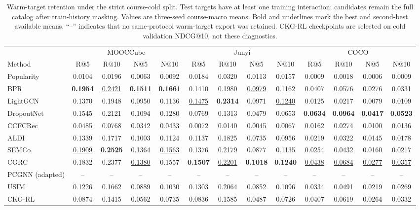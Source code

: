\documentclass[letterpaper]{article}
\begin{document}
\thispagestyle{empty}
\makeatletter
\setlength{\@dblfptop}{0pt}
\setlength{\@dblfpbot}{0pt plus 1fil}
\makeatother
\begin{table}[!t]
\centering
{\small
\setlength{\tabcolsep}{1.35pt}
\renewcommand{\arraystretch}{0.98}
\begin{tabular}{lcccccccccccc}
\toprule
& \multicolumn{4}{c}{MOOCCube} & \multicolumn{4}{c}{Junyi} & \multicolumn{4}{c}{COCO} \\
\cmidrule(lr){2-5}\cmidrule(lr){6-9}\cmidrule(lr){10-13}
Method & R@5 & R@10 & N@5 & N@10 & R@5 & R@10 & N@5 & N@10 & R@5 & R@10 & N@5 & N@10 \\
\midrule
Popularity & 0.0104 & 0.0196 & 0.0063 & 0.0092 & 0.0184 & 0.0320 & 0.0113 & 0.0157 & 0.0009 & 0.0018 & 0.0006 & 0.0009 \\
BPR & \textbf{0.1954} & \underline{0.2421} & \textbf{0.1511} & \textbf{0.1661} & 0.1410 & 0.1980 & \underline{0.0979} & 0.1162 & 0.0407 & 0.0576 & 0.0276 & 0.0331 \\
LightGCN & 0.1370 & 0.1948 & 0.0950 & 0.1136 & \underline{0.1475} & \textbf{0.2314} & 0.0971 & \underline{0.1240} & 0.0125 & 0.0217 & 0.0079 & 0.0109 \\
DropoutNet & 0.1545 & 0.2121 & 0.1094 & 0.1280 & 0.0769 & 0.1313 & 0.0479 & 0.0653 & \textbf{0.0634} & \textbf{0.0964} & \textbf{0.0417} & \textbf{0.0523} \\
CCFCRec & 0.0485 & 0.0768 & 0.0342 & 0.0433 & 0.0072 & 0.0140 & 0.0045 & 0.0067 & 0.0162 & 0.0274 & 0.0100 & 0.0136 \\
ALDI & 0.1339 & 0.1717 & 0.1003 & 0.1124 & 0.1137 & 0.1825 & 0.0735 & 0.0956 & 0.0219 & 0.0322 & 0.0145 & 0.0178 \\
SEMCo & \underline{0.1909} & \textbf{0.2525} & 0.1364 & \underline{0.1563} & 0.1376 & 0.2179 & 0.0877 & 0.1135 & 0.0254 & 0.0432 & 0.0160 & 0.0217 \\
CGRC & 0.1832 & 0.2377 & \underline{0.1380} & 0.1557 & \textbf{0.1507} & \underline{0.2201} & \textbf{0.1018} & \textbf{0.1240} & \underline{0.0438} & \underline{0.0684} & \underline{0.0277} & \underline{0.0357} \\
PCGNN (adapted) & -- & -- & -- & -- & -- & -- & -- & -- & -- & -- & -- & -- \\
USIM & 0.1226 & 0.1662 & 0.0889 & 0.1030 & 0.1303 & 0.2064 & 0.0852 & 0.1096 & 0.0334 & 0.0491 & 0.0219 & 0.0269 \\
\midrule
CKG-RL & 0.0874 & 0.1415 & 0.0562 & 0.0735 & 0.0836 & 0.1585 & 0.0487 & 0.0726 & 0.0407 & 0.0619 & 0.0264 & 0.0332 \\
\bottomrule
\end{tabular}
}
\caption{Warm-target retention under the strict course-cold split. Test targets have at least one training interaction; candidates remain the full catalog after train-history masking. Values are three-seed course-macro means. Bold and underlines mark the best and second-best available means. ``--'' indicates that no same-protocol warm-target export was retained. CKG-RL checkpoints are selected on cold validation NDCG@10, not these diagnostics.}
\label{tab:warm-target-retention}
\end{table}
\end{document}
